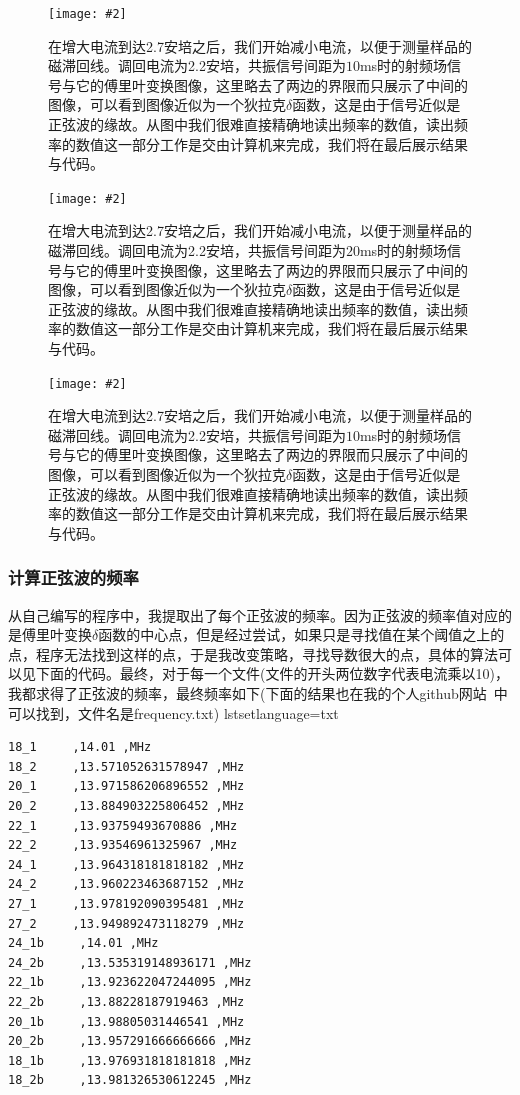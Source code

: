 \documentclass{ctexart}
\newcommand{\cpic}[2]{
\begin{center}
\texttt{[image: \#2]}
\end{center}
}
\newcommand{\cpicn}[3]
{
\begin{figure}[H]
\cpic{#1}{#2}
\caption{#3\label{#2}}
\end{figure}
}
\begin{document}
\cpicn{0.5}{20_2b}{在增大电流到达2.7安培之后，我们开始减小电流，以便于测量样品的磁滞回线。调回电流为2.2安培，共振信号间距为$10$ms时的射频场信号与它的傅里叶变换图像，这里略去了两边的界限而只展示了中间的图像，可以看到图像近似为一个狄拉克$\delta$函数，这是由于信号近似是正弦波的缘故。从图中我们很难直接精确地读出频率的数值，读出频率的数值这一部分工作是交由计算机来完成，我们将在最后展示结果与代码。}
\cpicn{0.5}{18_1b}{在增大电流到达2.7安培之后，我们开始减小电流，以便于测量样品的磁滞回线。调回电流为2.2安培，共振信号间距为$20$ms时的射频场信号与它的傅里叶变换图像，这里略去了两边的界限而只展示了中间的图像，可以看到图像近似为一个狄拉克$\delta$函数，这是由于信号近似是正弦波的缘故。从图中我们很难直接精确地读出频率的数值，读出频率的数值这一部分工作是交由计算机来完成，我们将在最后展示结果与代码。}
\cpicn{0.5}{18_2b}{在增大电流到达2.7安培之后，我们开始减小电流，以便于测量样品的磁滞回线。调回电流为2.2安培，共振信号间距为$10$ms时的射频场信号与它的傅里叶变换图像，这里略去了两边的界限而只展示了中间的图像，可以看到图像近似为一个狄拉克$\delta$函数，这是由于信号近似是正弦波的缘故。从图中我们很难直接精确地读出频率的数值，读出频率的数值这一部分工作是交由计算机来完成，我们将在最后展示结果与代码。}
\subsubsection{计算正弦波的频率}
从自己编写的程序中，我提取出了每个正弦波的频率。因为正弦波的频率值对应的是傅里叶变换$\delta$函数的中心点，但是经过尝试，如果只是寻找值在某个阈值之上的点，程序无法找到这样的点，于是我改变策略，寻找导数很大的点，具体的算法可以见下面的代码。最终，对于每一个文件(文件的开头两位数字代表电流乘以10)，我都求得了正弦波的频率，最终频率如下(下面的结果也在我的个人github网站~\cite{git_xu}中可以找到，文件名是frequency.txt)
lstset{language=txt}
\begin{lstlisting}
18_1     ,14.01 ,MHz
18_2     ,13.571052631578947 ,MHz
20_1     ,13.971586206896552 ,MHz
20_2     ,13.884903225806452 ,MHz
22_1     ,13.93759493670886 ,MHz
22_2     ,13.93546961325967 ,MHz
24_1     ,13.964318181818182 ,MHz
24_2     ,13.960223463687152 ,MHz
27_1     ,13.978192090395481 ,MHz
27_2     ,13.949892473118279 ,MHz
24_1b     ,14.01 ,MHz
24_2b     ,13.535319148936171 ,MHz
22_1b     ,13.923622047244095 ,MHz
22_2b     ,13.88228187919463 ,MHz
20_1b     ,13.98805031446541 ,MHz
20_2b     ,13.957291666666666 ,MHz
18_1b     ,13.976931818181818 ,MHz
18_2b     ,13.981326530612245 ,MHz
\end{lstlisting}
\end{document}
